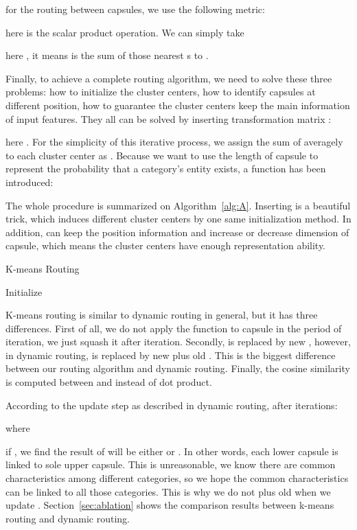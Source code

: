 \documentclass[times,twocolumn,final]{elsarticle}
\begin{document}
for the routing between capsules, we use the following metric:
    
here  is the scalar product operation. We can simply take
    
here , it means  is the sum of those nearest s to . 

Finally, to achieve a complete routing algorithm, we need to solve these three problems: how to initialize the cluster centers, how to identify capsules at different position, how to guarantee the cluster centers keep the main information of input features. They all can be solved by inserting transformation matrix :
    
here . For the simplicity of this iterative process, we assign the sum of  averagely to each cluster center as . Because we want to use the length of capsule to represent the probability that a category's entity exists, a  function has been introduced:
    
    
The whole procedure is summarized on Algorithm~\ref{alg:A}. Inserting  is a beautiful trick, which induces different cluster centers by one same initialization method. In addition,  can keep the position information and increase or decrease dimension of capsule, which means the cluster centers have enough representation ability.

\begin{algorithm}
  \caption{K-means Routing}
  \label{alg:A}
  \begin{algorithmic}[1]
    \State Initialize 
	 \State 
      \State 
	  \State 
	\EndFor
	\State \Return 
	\EndProcedure
  \end{algorithmic}
\end{algorithm}

K-means routing is similar to dynamic routing in general, but it has three differences. First of all, we do not apply the  function to capsule  in the period of iteration, we just squash it after iteration. Secondly,  is replaced by new , however, in dynamic routing,  is replaced by new  plus old . This is the biggest difference between our routing algorithm and dynamic routing. Finally, the cosine similarity is computed between  and  instead of dot product.

According to the  update step as described in dynamic routing, after  iterations:
    
where 
    
if , we find the result of  will be either  or . In other words, each lower capsule is linked to sole upper capsule. This is unreasonable, we know there are common characteristics among different categories, so we hope the common characteristics can be linked to all those categories. This is why we do not plus old  when we update . Section~\ref{sec:ablation} shows the comparison results between k-means routing and dynamic routing.
\end{document}
